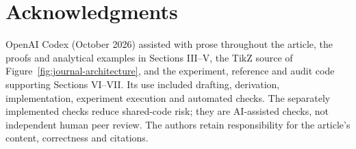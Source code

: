 \documentclass[preprint,12pt]{elsarticle}
\theoremstyle{definition}\newtheorem{definition}[theorem]{Definition}
\begin{document}
\section*{Acknowledgments}
OpenAI Codex (October 2026) assisted with prose throughout the article,
the proofs and analytical examples in Sections III--V, the TikZ source
of Figure~\ref{fig:journal-architecture}, and the experiment, reference and
audit code supporting Sections VI--VII. Its use included drafting,
derivation, implementation, experiment execution and automated checks.
The separately implemented checks reduce shared-code risk; they are
AI-assisted checks, not independent human peer review. The authors retain
responsibility for the article's content, correctness and citations.


\end{document}
